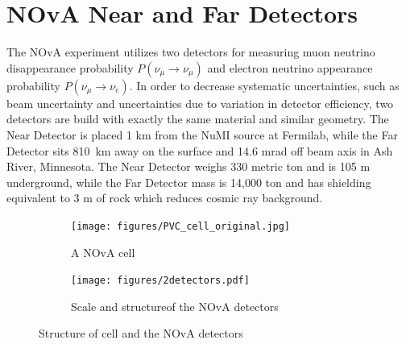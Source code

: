 \section{NOvA Near and Far Detectors}
The NOvA experiment utilizes two detectors for measuring muon neutrino disappearance probability 
$P(\nu_\mu \rightarrow \nu_\mu)$ and electron neutrino appearance probability $P(\nu_\mu \rightarrow \nu_e)$. 
In order to decrease systematic uncertainties, such as beam uncertainty and uncertainties due to variation
in detector efficiency, two detectors are build with exactly the same material and 
similar geometry. The Near Detector is placed 1 km from the NuMI source at Fermilab, while the 
Far Detector sits 810~km away on the surface and 14.6 mrad off beam axis in Ash River, Minnesota. 
The Near Detector weighs 330 metric ton and is 105 m underground, while the Far Detector mass is 
14,000 ton and has shielding equivalent to 3 m of rock which reduces cosmic ray background.
\begin{figure}
\begin{subfigure}{.2\textwidth}
  \centering
  \texttt{[image: figures/PVC\_cell\_original.jpg]}
  \caption{A NOvA cell}
  \label{fig:cell}
\end{subfigure}%
\begin{subfigure}{.8\textwidth}
  \centering
  \texttt{[image: figures/2detectors.pdf]}
  \caption{Scale and structureof the NOvA detectors}
  \label{fig:2detectors}
\end{subfigure}
\caption{Structure of cell and the NOvA detectors}
\label{fig:cell_detectors}
\end{figure}

